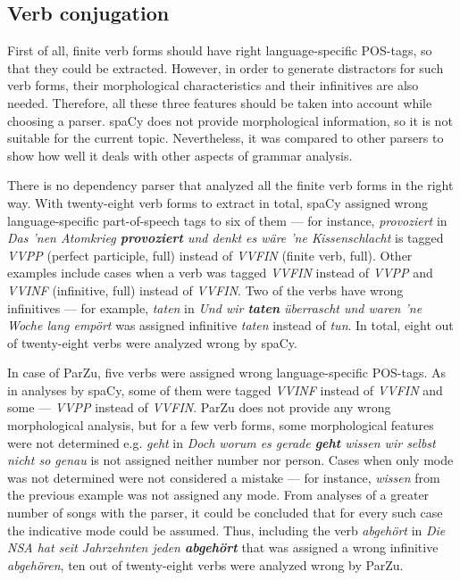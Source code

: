 \subsection{Verb conjugation}

First of all, finite verb forms should have right language-specific POS-tags, so that they could be extracted. However, in order to generate distractors for such verb forms, their morphological characteristics and their infinitives are also needed. Therefore, all these three features should be taken into account while choosing a parser. spaCy does not provide morphological information, so it is not suitable for the current topic. Nevertheless, it was compared to other parsers to show how well it deals with other aspects of grammar analysis.

There is no dependency parser that analyzed all the finite verb forms in the right way. With twenty-eight verb forms to extract in total, spaCy assigned wrong language-specific part-of-speech tags to six of them --- for instance, \textit{provoziert} in \textit{Das 'nen Atomkrieg \textbf{provoziert} und denkt es wäre 'ne Kissenschlacht} is tagged \textit{VVPP} (perfect participle, full) instead of \textit{VVFIN} (finite verb, full). Other examples include cases when a verb was tagged \textit{VVFIN} instead of \textit{VVPP} and \textit{VVINF} (infinitive, full) instead of \textit{VVFIN}.  Two of the verbs have wrong infinitives --- for example, \textit{taten} in \textit{Und wir \textbf{taten} überrascht und waren 'ne Woche lang empört} was assigned infinitive \textit{taten} instead of \textit{tun}. In total, eight out of twenty-eight verbs were analyzed wrong by spaCy.

In case of ParZu, five verbs were assigned wrong language-specific POS-tags. As in analyses by spaCy, some of them were tagged \textit{VVINF} instead of \textit{VVFIN} and some --- \textit{VVPP} instead of \textit{VVFIN}. ParZu does not provide any wrong morphological analysis, but for a few verb forms, some morphological features were not determined e.g. \textit{geht} in \textit{Doch worum es gerade \textbf{geht} wissen wir selbst nicht so genau} is not assigned neither number nor person. Cases when only mode was not determined were not considered a mistake --- for instance, \textit{wissen} from the previous example was not assigned any mode. From analyses of a greater number of songs with the parser, it could be concluded that for every such case the indicative mode could be assumed. Thus, including the verb \textit{abgehört} in \textit{Die NSA hat seit Jahrzehnten jeden \textbf{abgehört}} that was assigned a wrong infinitive \textit{abgehören}, ten out of twenty-eight verbs were analyzed wrong by ParZu.

